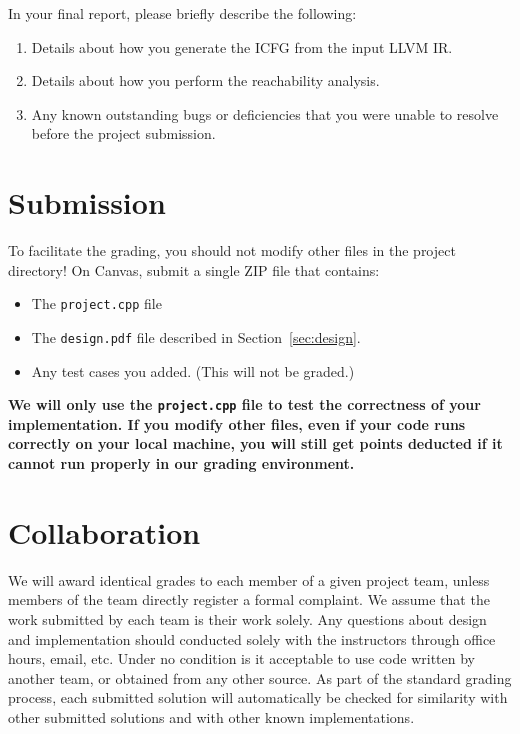 \documentclass[12pt]{article}
\newcommand{\codeIn}[1]{{\small\tt{#1}}}
\newcommand{\implementationFile}{\codeIn{project.cpp} }
\begin{document}
In your final report, 
please briefly describe the following:
%
\begin{enumerate}
\item Details about how you generate the ICFG from the input LLVM IR.
\item Details about how you perform the reachability analysis.
\item Any known outstanding bugs or deficiencies that you were unable
  to   resolve before the project submission.
 \end{enumerate}

\section{Submission}\label{sec:sub}
To facilitate the grading, you should not modify
other files in the project directory!
On Canvas, submit a single ZIP file that contains:
\begin{itemize}
    \item The \implementationFile file
    \item The \codeIn{design.pdf} file described in Section~\ref{sec:design}.
    \item Any test cases you added. (This will not be graded.)
\end{itemize}
\textbf{We will only use the \implementationFile file to test the correctness of your implementation. If you modify other files, even if your code runs correctly on your local machine,
you will still get points deducted if it cannot run properly in our grading environment.}

\section{Collaboration}
%
We will award identical grades to each member of a given project team,
unless members of the team directly register a formal complaint.
%
We assume that the work submitted by each team is their work solely.
% 
Any questions about design and implementation should conducted solely with the instructors through office hours, email, etc.
%
Under no condition is it acceptable to use code written by another
team, or obtained from any other source.
%
As part of the standard grading process, each submitted solution will
automatically be checked for similarity with other submitted solutions and with other known
implementations.
\end{document}
